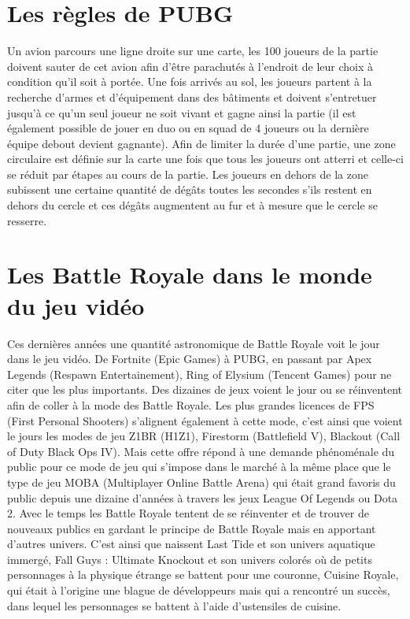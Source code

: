 \section{Les règles de PUBG}
Un avion parcours une ligne droite sur une carte, les 100 joueurs de la partie doivent sauter de cet avion afin d'être parachutés à l'endroit de leur choix à condition qu'il soit à portée. Une fois arrivés au sol, les joueurs partent à la recherche d'armes et d'équipement dans des bâtiments et doivent s'entretuer jusqu'à ce qu'un seul joueur ne soit vivant et gagne ainsi la partie (il est également possible de jouer en duo ou en squad de 4 joueurs ou la dernière équipe debout devient gagnante). Afin de limiter la durée d'une partie, une zone circulaire est définie sur la carte une fois que tous les joueurs ont atterri et celle-ci se réduit par étapes au cours de la partie. Les joueurs en dehors de la zone subissent une certaine quantité de dégâts toutes les secondes s'ils restent en dehors du cercle et ces dégâts augmentent au fur et à mesure que le cercle se resserre.

\section{Les Battle Royale dans le monde du jeu vidéo}
Ces dernières années une quantité astronomique de Battle Royale voit le jour dans le jeu vidéo. De Fortnite (Epic Games) à PUBG, en passant par Apex Legends (Respawn Entertainement), Ring of Elysium (Tencent Games) pour ne citer que les plus importants. Des dizaines de jeux voient le jour ou se réinventent afin de coller à la mode des Battle Royale. Les plus grandes licences de FPS (First Personal Shooters) s'alignent également à cette mode, c'est ainsi que voient le jours les modes de jeu Z1BR (H1Z1), Firestorm (Battlefield V), Blackout (Call of Duty Black Ops IV). Mais cette offre répond à une demande phénoménale du public pour ce mode de jeu qui s'impose dans le marché à la même place que le type de jeu MOBA (Multiplayer Online Battle Arena) qui était grand favoris du public depuis une dizaine d'années à travers les jeux League Of Legends ou Dota 2. Avec le temps les Battle Royale tentent de se réinventer et de trouver de nouveaux publics en gardant le principe de Battle Royale mais en apportant d'autres univers. C'est ainsi que naissent Last Tide et son univers aquatique immergé, Fall Guys : Ultimate Knockout et son univers colorés où de petits personnages à la physique étrange se battent pour une couronne, Cuisine Royale, qui était à l'origine une blague de développeurs mais qui a rencontré un succès, dans lequel les personnages se battent à l'aide d'ustensiles de cuisine.

